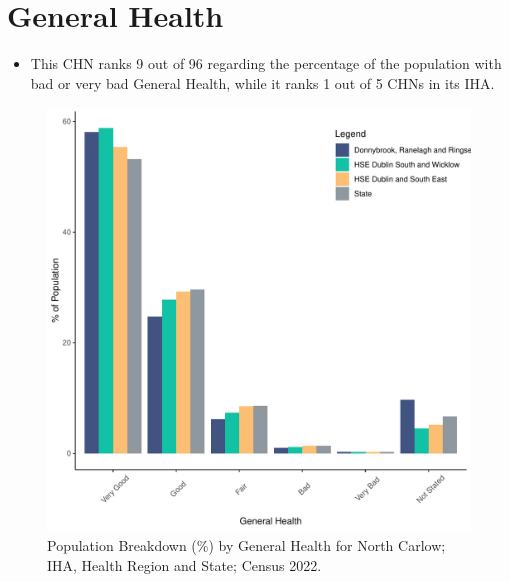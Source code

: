 \documentclass{article}
\begin{document}
\pagebreak

\section{General Health}\label{sect:GenHealth}
\begin{itemize}
\item  This CHN ranks  9 out of 96 regarding the percentage of the population with bad or very bad General Health, while it ranks   1 out of 5 CHNs in its IHA.
\end{itemize}
\begin{figure}[h]
	\centering
	\includegraphics[width = 150mm]{../figures/GenED.pdf}
	\caption{Population Breakdown (\%) by General Health for North Carlow; IHA, Health Region and State;  Census 2022.}
	\label{fig:2ae19629-1a6a-13a3-e055-000000000001}
	\end{figure}
\end{document}
